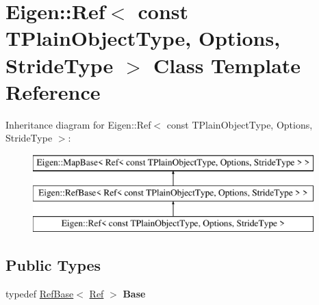 \hypertarget{class_eigen_1_1_ref_3_01const_01_t_plain_object_type_00_01_options_00_01_stride_type_01_4}{}\section{Eigen\+::Ref$<$ const T\+Plain\+Object\+Type, Options, Stride\+Type $>$ Class Template Reference}
\label{class_eigen_1_1_ref_3_01const_01_t_plain_object_type_00_01_options_00_01_stride_type_01_4}
Inheritance diagram for Eigen\+::Ref$<$ const T\+Plain\+Object\+Type, Options, Stride\+Type $>$\+:\begin{figure}[H]
\begin{center}
\leavevmode
\includegraphics[height=3.000000cm]{class_eigen_1_1_ref_3_01const_01_t_plain_object_type_00_01_options_00_01_stride_type_01_4}
\end{center}
\end{figure}
\subsection*{Public Types}
\begin{DoxyCompactItemize}
\item 
\mbox{\label{class_eigen_1_1_ref_3_01const_01_t_plain_object_type_00_01_options_00_01_stride_type_01_4_a761b257d77371a3cfbdacda03211fd91}} 
typedef \mbox{\hyperlink{class_eigen_1_1_ref_base}{Ref\+Base}}$<$ \mbox{\hyperlink{class_eigen_1_1_ref}{Ref}} $>$ {\bfseries Base}
\end{DoxyCompactItemize}
